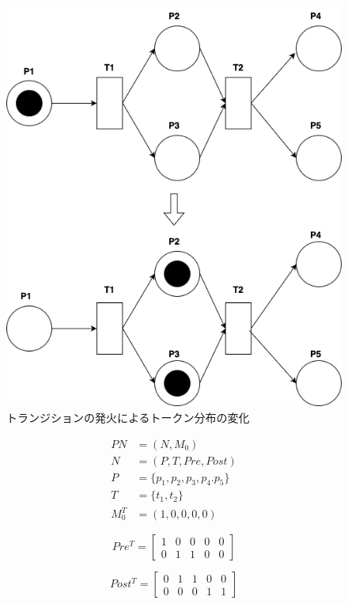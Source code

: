 \documentclass[conference]{IEEEtran}
\begin{document}
\begin{figure}[htbp]
\centerline{\includegraphics[scale=0.3]{./fig/fire.pdf}}
\caption{トランジションの発火によるトークン分布の変化}
\label{fig2}
\end{figure}

\begin{align}
PN &= (N,M_0) \\
N &= (P,T,Pre,Post) \\
P &= \{p_1,p_2,p_3,p_4.p_5\} \\
T &= \{t_1,t_2\} \\
M_0^T &= (1,0,0,0,0)
\end{align}

$$
Pre^T =
\begin{bmatrix}
  1 & 0 & 0 & 0 & 0 \\
  0 & 1 & 1 & 0 & 0
\end{bmatrix}
$$

$$
Post^T =
\begin{bmatrix}
  0 & 1 & 1 & 0 & 0 \\
  0 & 0 & 0 & 1 & 1  
\end{bmatrix}
$$
\end{document}
